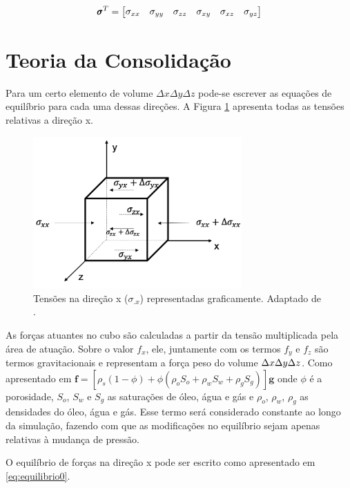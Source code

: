 \begin{equation}
\pmb{\sigma}^T = \begin{bmatrix}
\sigma_{xx} & \sigma_{yy} & \sigma_{zz} & \sigma_{xy} & \sigma_{xz} & \sigma_{yz}
\end{bmatrix}
\label{eq:tensor6}
\end{equation}


\section{Teoria da Consolidação}

Para um certo elemento de volume $\Delta x\Delta y \Delta z$ pode-se escrever as equações de equilíbrio para cada uma dessas direções. A Figura \ref{fig:equilibrio} apresenta todas as tensões relativas a direção x.

\begin{figure}[!htbp]
\centering
\includegraphics[width=8cm]{chap01/figs/equilibrio.png}
\caption{Tensões na direção x ($\sigma_{.x}$) representadas graficamente.  Adaptado de \cite{CompGeomec}.}
\label{fig:equilibrio}
\end{figure}


As forças atuantes no cubo são calculadas a partir da tensão multiplicada pela área de atuação. Sobre o valor $f_x$, ele, juntamente com os termos $f_y$ e $f_z$  são termos gravitacionais e representam a força peso do volume $\Delta x\Delta y\Delta z$. Como apresentado em \citet{xiuligai} $\mathbf{f} = [\rho_s(1-\phi) + \phi(\rho_o S_o + \rho_w S_w + \rho_g S_g )] \mathbf{g}$ onde $\phi$ é a porosidade, $S_o$, $S_w$ e $S_g$ as saturações de óleo, água e gás e $\rho_o$, $\rho_w$, $\rho_g$  as densidades do óleo, água e gás. Esse termo será considerado constante ao longo da simulação, fazendo com que as modificações no equilíbrio sejam apenas relativas à mudança de pressão. 

O equilíbrio de forças na direção x pode ser escrito como apresentado em \eqref{eq:equilibrio0}. 


